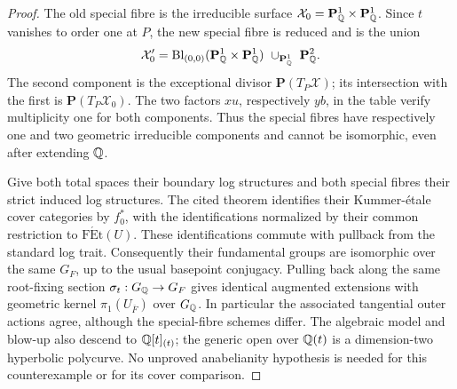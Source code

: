 \begin{proof}
The old special fibre is the irreducible surface
$\mathcal X_0=\mathbf P^1_{\mathbb{Q}}\times\mathbf P^1_{\mathbb{Q}}$.
Since $t$ vanishes to order one at $P$, the new special fibre is reduced
and is the union
\[
 \mathcal X'_0=
 \operatorname{Bl}_{(0,0)}
       (\mathbf P^1_{\mathbb{Q}}\times\mathbf P^1_{\mathbb{Q}})
 \ \cup_{\mathbf P^1_{\mathbb{Q}}}\ \mathbf P^2_{\mathbb{Q}} .
\]
The second component is the exceptional divisor
$\mathbf P(T_P\mathcal X)$; its intersection with the first is
$\mathbf P(T_P\mathcal X_0)$. The two factors $xu$, respectively $yb$,
in the table verify multiplicity one for both components. Thus the
special fibres have respectively one and two geometric irreducible
components and cannot be isomorphic, even after extending ${\mathbb{Q}}$.

Give both total spaces their boundary log structures and both special
fibres their strict induced log structures. The cited theorem identifies
their Kummer-\'etale cover categories by $f_0^*$, with the identifications
normalized by their common restriction to $\operatorname{F\acute Et}(U)$.
These identifications commute with pullback from the standard log trait.
Consequently their fundamental groups are isomorphic over the same
$G_F$, up to the usual basepoint conjugacy. Pulling back along the same
root-fixing section $\sigma_t:G_{\mathbb{Q}}\to G_F$ gives identical augmented
extensions with geometric kernel $\pi_1(U_{\overline F})$ over $G_{\mathbb{Q}}$.
In particular the associated tangential outer actions agree, although
the special-fibre schemes differ. The algebraic model and blow-up also
descend to ${\mathbb{Q}}[t]_{(t)}$; the generic open over ${\mathbb{Q}}(t)$ is a
dimension-two hyperbolic polycurve. No unproved anabelianity hypothesis
is needed for this counterexample or for its cover comparison.
\end{proof}
